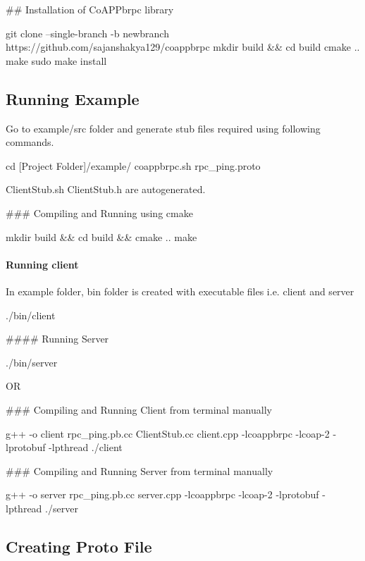 \#\# Installation of Co\+A\+P\+Pbrpc library 
\begin{DoxyCode}
git clone --single-branch -b newbranch https://github.com/sajanshakya129/coappbrpc
mkdir build && cd build
cmake ..
make
sudo make install
\end{DoxyCode}


\subsection*{Running Example}

Go to example/src folder and generate stub files required using following commands. 
\begin{DoxyCode}
cd [Project Folder]/example/
coappbrpc.sh rpc\_ping.proto
\end{DoxyCode}
 Client\+Stub.\+sh Client\+Stub.\+h are autogenerated.

\#\#\# Compiling and Running using cmake 
\begin{DoxyCode}
mkdir build && cd build && cmake ..
make
\end{DoxyCode}
 \paragraph*{Running client}

In example folder, bin folder is created with executable files i.\+e. client and server 
\begin{DoxyCode}
./bin/client
\end{DoxyCode}
 \#\#\#\# Running Server 
\begin{DoxyCode}
./bin/server
\end{DoxyCode}
 OR

\#\#\# Compiling and Running Client from terminal manually 
\begin{DoxyCode}
g++ -o client rpc\_ping.pb.cc ClientStub.cc client.cpp -lcoappbrpc -lcoap-2 -lprotobuf -lpthread
./client
\end{DoxyCode}
 \#\#\# Compiling and Running Server from terminal manually 
\begin{DoxyCode}
g++ -o server rpc\_ping.pb.cc server.cpp -lcoappbrpc -lcoap-2 -lprotobuf -lpthread
./server
\end{DoxyCode}


\subsection*{Creating Proto File}

